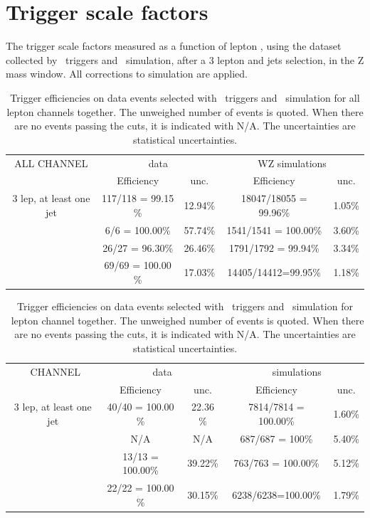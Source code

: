 

\chapter{Trigger scale factors}
\label{app:TriggerSF}



The trigger scale factors measured as a function of lepton \pt, using the dataset collected by \Etmis\ triggers and \WZ\ simulation, after a 3 lepton and jets selection, in the Z mass window. All corrections to simulation are applied.



\begin{table}[htbp]
	\centering
	\caption{Trigger efficiencies on data events selected with \Etmis\ triggers and \WZ\ simulation for all lepton channels together. The unweighed number of events is quoted. When there are no events passing the cuts, it is indicated with N/A. The uncertainties are statistical uncertainties.}
	\begin{tabular}{c|c|c|c|c}
		\toprule
		ALL CHANNEL & \multicolumn{2}{c|}{data} & \multicolumn{2}{c}{WZ simulations} \\ 
		& Efficiency & unc. & Efficiency & unc. \\
		\midrule 
		3 lep,  at least one jet & 117/118 = 99.15 \% & 12.94\% & 18047/18055 = 99.96\%  & 1.05\% \\ 
		\hline 
		\STSR & 6/6 = 100.00\% & 57.74\% & 1541/1541 = 100.00\% & 3.60\% \\ 
		\hline 
		\TTSR & 26/27 = 96.30\% & 26.46\% & 1791/1792 = 99.94\% & 3.34\% \\ 
		\hline 
		\WZCR & 69/69 = 100.00 \% & 17.03\% & 14405/14412=99.95\% & 1.18\% \\ 
		\bottomrule 
	\end{tabular} 
\end{table}	
\begin{table}[htbp]
	\centering
	\caption{Trigger efficiencies on data events selected with \Etmis\ triggers and \WZ\ simulation for \mumumu\ lepton channel together. The unweighed number of events is quoted. When there are no events passing the cuts, it is indicated with N/A. The uncertainties are statistical uncertainties.}
	\begin{tabular}{c|c|c|c|c}
		\toprule 
		\mumumu\ CHANNEL & \multicolumn{2}{c|}{data} & \multicolumn{2}{c}{\WZ\ simulations} \\
		& Efficiency & unc. & Efficiency & unc. \\ 
		\midrule 
		3 lep,  at least one jet & 40/40 = 100.00 \% & 22.36 \% & 7814/7814 = 100.00\%  & 1.60\% \\ 
		\hline 
		\STSR & N/A & N/A & 687/687 = 100\% & 5.40\% \\ 
		\hline 
		\TTSR & 13/13 = 100.00\% & 39.22\% &763/763 = 100.00\% & 5.12\% \\ 
		\hline 
		\WZCR & 22/22 = 100.00 \% & 30.15\% & 6238/6238=100.00\% & 1.79\% \\ 
		\bottomrule
	\end{tabular} 
\end{table}	
